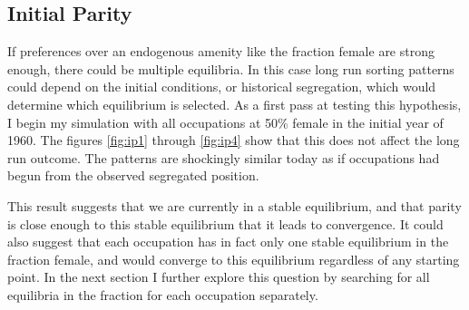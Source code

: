 \documentclass[11pt]{article}
\begin{document}
\subsection{Initial Parity}
If preferences over an endogenous amenity like the fraction female are strong enough, there could be multiple equilibria. In this case long run sorting patterns could depend on the initial conditions, or historical segregation, which would determine which equilibrium is selected. As a first pass at testing this hypothesis, I begin my simulation with all occupations at 50\% female in the initial year of 1960. The figures \ref{fig:ip1} through \ref{fig:ip4} show that this does not affect the long run outcome. The patterns are shockingly similar today as if occupations had begun from the observed segregated position. 

This result suggests that we are currently in a stable equilibrium, and that parity is close enough to this stable equilibrium that it leads to convergence. It could also suggest that each occupation has in fact only one stable equilibrium in the fraction female, and would converge to this equilibrium regardless of any starting point. In the next section I further explore this question by searching for all equilibria in the fraction for each occupation separately.











	
\end{document}

